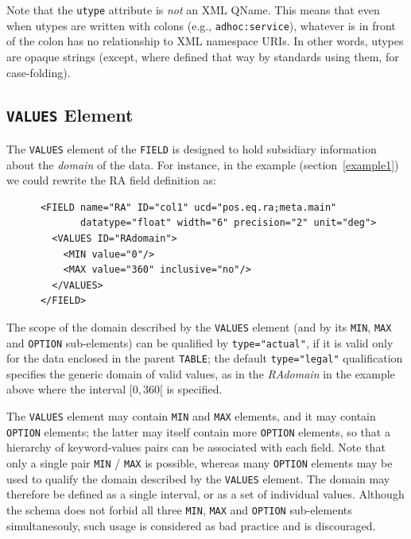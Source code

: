 \documentclass[11pt,a4paper]{ivoa}
\def\Aref#1{section~\ref{#1}}
\let\fg=\color
\def\attr#1{{\tt{\fg{DarkRed}#1}}}
\def\elem#1{{\tt{\fg{DarkRed}#1}}}
\def\attrval#1#2{{\tt{\fg{DarkRed}#1}="{\fg{DarkPurple}#2}"}}
\begin{document}
Note that the \attr{utype} attribute is \emph{not} an XML QName.  This
means that even when utypes are written with colons (e.g.,
\texttt{adhoc:service}), whatever is in front of the colon has no
relationship to XML namespace URIs.  In other words, utypes are opaque
strings (except, where defined that way by standards using them, for
case-folding).

\subsection{\elem{VALUES} Element}
\label{sec:values}

The {\elem{VALUES}} element of the {\elem{FIELD}}
is designed to hold subsidiary information about the {\em domain} of the
data. For instance, in the example (\Aref{example1})
we could rewrite the RA field definition as:

\begingroup\small
\begin{verbatim}
      <FIELD name="RA" ID="col1" ucd="pos.eq.ra;meta.main"
             datatype="float" width="6" precision="2" unit="deg">
        <VALUES ID="RAdomain">
          <MIN value="0"/>
          <MAX value="360" inclusive="no"/>
        </VALUES>
      </FIELD>
\end{verbatim}
\endgroup

\noindent The scope of the domain described by the \elem{VALUES} element
(and by its \elem{MIN}, \elem{MAX} and \elem{OPTION} sub-elements)
can be qualified by \attrval{type}{actual}, if it is valid only for
the data enclosed in the parent \elem{TABLE}; the default \attrval{type}{legal}
qualification specifies the generic domain of valid values, as in the
{\em RAdomain} in the example above where the interval $[0,360[$ is specified.

\label{elem:VALUES}
\label{elem:MIN}
\label{elem:MAX}
\label{elem:OPTION}
The \elem{VALUES} element may contain {\elem{MIN}} and {\elem{MAX}} elements,
and it may contain {\elem{OPTION}} elements;
the latter may itself contain more {\elem{OPTION}}
elements, so that a hierarchy of keyword-values pairs can be
associated with each field.
Note that only a single pair \elem{MIN} / \elem{MAX} is possible,
whereas many \elem{OPTION} elements may be used to qualify the domain
described by the \elem{VALUES} element.
The domain may therefore be defined as a single interval, or as a set
of individual values. Although the schema does not forbid all three
\elem{MIN}, \elem{MAX} and \elem{OPTION} sub-elements simultanesouly,
such usage is considered as bad practice and is discouraged.
\end{document}

